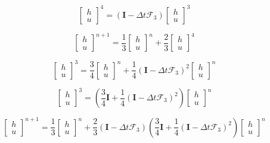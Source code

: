 \documentclass[12pt]{article}
\begin{document}
\[\left[\begin{array}{c}
h \\ u
\end{array}\right]^{4} = (\boldsymbol{I} - \Delta t\boldsymbol{\mathcal{F}}_3 )\left[\begin{array}{c}
h \\ u
\end{array}\right]^3\]

\[\left[\begin{array}{c}
h \\ u
\end{array}\right]^{n+1} = \frac{1}{3}\left[\begin{array}{c}
h \\ u
\end{array}\right]^n + \frac{2}{3}\left[\begin{array}{c}
h \\ u
\end{array}\right]^{4}\]

\[\left[\begin{array}{c}
h \\ u
\end{array}\right]^{3} = \frac{3}{4}\left[\begin{array}{c}
h \\ u
\end{array}\right]^n +  \frac{1}{4}(\boldsymbol{I} - \Delta t\boldsymbol{\mathcal{F}}_3 )^2\left[\begin{array}{c}
h \\ u
\end{array}\right]^n\]

\[\left[\begin{array}{c}
h \\ u
\end{array}\right]^{3} = \left(\frac{3}{4}\boldsymbol{I}  +  \frac{1}{4}(\boldsymbol{I} - \Delta t\boldsymbol{\mathcal{F}}_3 )^2\right)\left[\begin{array}{c}
h \\ u
\end{array}\right]^n\]

\[\left[\begin{array}{c}
h \\ u
\end{array}\right]^{n+1} = \frac{1}{3}\left[\begin{array}{c}
h \\ u
\end{array}\right]^n + \frac{2}{3}(\boldsymbol{I} - \Delta t\boldsymbol{\mathcal{F}}_3 )\left(\frac{3}{4}\boldsymbol{I}  +  \frac{1}{4}\left(\boldsymbol{I} - \Delta t\boldsymbol{\mathcal{F}}_3 \right)^2\right)\left[\begin{array}{c}
h \\ u
\end{array}\right]^n\]
\end{document}

